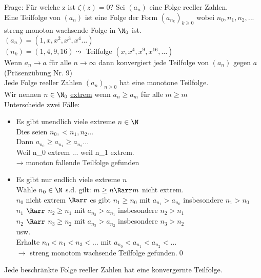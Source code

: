 Frage: Für welche z ist $\zeta(z)=0$?
%
Sei $(a_n)$ eine Folge reeller Zahlen.\\
Eine Teilfolge von $(a_n)$ ist eine Folge der Form $(a_{n_k})_{k \geq 0}$ wobei $n_0, n_1, n_2,...$ streng monoton wachsende Folge in $\N_0$ ist.\\
\bsp
$(a_n) = (1, x, x^2, x^3 , x^4 ...)$\\
$(n_k) = (1, 4, 9, 16) \leadsto $ Teilfolge $(x, x^4, x^9, x^{16} ,…)$\\
Wenn $a_n \to a$ für alle $n \to \infty$ dann konvergiert jede Teilfolge von $(a_n)$ gegen $a$ (Präsenzübung Nr. 9)\\
%
Jede Folge reeller Zahlen $(a_n)_{n\geq 0}$ hat eine monotone Teilfolge.\\
%
\bew
Wir nennen $n\in \N_0$ \underline{extrem} wenn $a_n \geq a_m$ für alle $m \geq m$\\
Unterscheide zwei Fälle:\\
\begin{itemize}
    \item{Es gibt unendlich viele extreme $n \in \N$\\
Dies seien $n_0, < n_1, n_2...$\\
Dann $a_{n_0} \geq a_{n_1} \geq a_{n_2} …$\\
Weil n_0 extrem ... weil n_1 extrem.\\
→ monoton fallende Teilfolge gefunden}
    \item{Es gibt nur endlich viele extreme $n$\\
Wähle $n_0 \in \N$ s.d. gilt: $m \geq n \Rarr m$ nicht extrem.\\
$n_0$ nicht extrem $\Rarr$ es gibt $n_1 \geq n_0$ mit $a_{n_1} > a_{n_0}$ insbesondere $n_1 > n_0$\\
$n_1$ \phantom{nicht extrem }$\Rarr$ \phantom{es gibt }$n_2 \geq n_1$ mit $a_{n_2} > a_{n_1}$ insbesondere $n_2 > n_1$\\
$n_2$ \phantom{nicht extrem }$\Rarr$ \phantom{es gibt }$n_3 \geq n_2$ mit $a_{n_3} > a_{n_2}$ insbesondere $n_3 > n_2$\\
usw.\\
Erhalte $n_0 < n_1 < n_3 < …$ mit $a_{n_0} < a_{n_1} < a_{n_2} < …$ \\
$\to $ streng monotom wachsende Teilfolge gefunden.\qed
}
\end{itemize}
Jede beschränkte Folge reeller Zahlen hat eine konvergernte Teilfolge.\\
